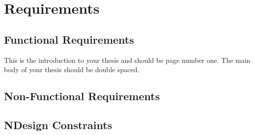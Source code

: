 \chapter{Requirements}

\section{Functional Requirements}

This is the introduction to your thesis and should be page number one.
The main body of your thesis should be double spaced.

\section{Non-Functional Requirements}

\section{NDesign Constraints}